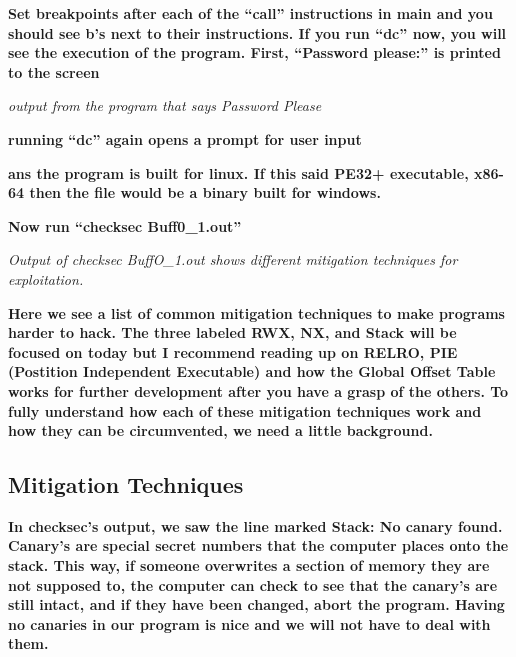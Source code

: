 \documentclass[letterpaper]{article}
\newcommand{\sitfig}[3]{
\begin{figure}[H]
\centering
\makebox[\textwidth][c]{
#2
}
\label{#1}
\end{figure}
}
\newcommand{\sitgfx}[4][scale=1.0]{
\sitfig{#3}{\texttt{[image: \#2]}}{#4}
}
\begin{document}
  
\sitgfx[width=5.8335in,height=3.6457in]{FINALWORKINGDOCFORMERLYPRECURSOR-img081.png}{fig:unk}{TODO CAPTION}
 

\textbf{Set breakpoints after each of the ``call'' instructions in main and you should see b's next to their
instructions. If you run ``dc'' now, you will see the execution of the program. First, ``Password please:'' is printed
to the screen}

  
\sitgfx[width=5.8335in,height=3.6457in]{FINALWORKINGDOCFORMERLYPRECURSOR-img082.png}{fig:unk}{TODO CAPTION}
 

\textit{output from the program that says Password Please}

\textbf{running ``dc'' again opens a prompt for user input}

\textbf{ans the program is built for linux. If this said PE32+ executable, x86-64 then the file would be a binary built
for windows.}

  
\sitgfx[width=5.8335in,height=0.9602in]{FINALWORKINGDOCFORMERLYPRECURSOR-img074.png}{fig:unk}{TODO CAPTION}
 

\textbf{Now run ``checksec Buff0\_1.out''}  
\sitgfx[width=5.8335in,height=3.6457in]{FINALWORKINGDOCFORMERLYPRECURSOR-img083.png}{fig:unk}{TODO CAPTION}
 

\textit{Output of checksec BuffO\_1.out shows different mitigation techniques for exploitation.}

\textbf{Here we see a list of common mitigation techniques to make programs harder to hack. The three labeled RWX, NX,
and Stack will be focused on today but I recommend reading up on RELRO, PIE (Postition Independent Executable) and how
the Global Offset Table works for further development after you have a grasp of the others. To fully understand how
each of these mitigation techniques work and how they can be circumvented, we need a little background.}

\subsection{Mitigation Techniques}

\textbf{In checksec's output, we saw the line marked Stack: No canary found. Canary's are special secret numbers that
the computer places onto the stack. This way, if someone overwrites a section of memory they are not supposed to, the
computer can check to see that the canary's are still intact, and if they have been changed, abort the program. Having
no canaries in our program is nice and we will not have to deal with them.}
\end{document}
